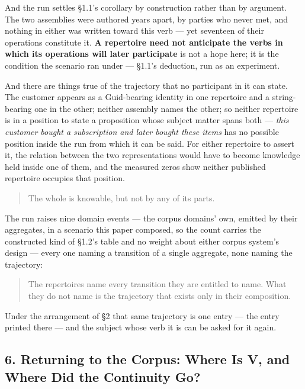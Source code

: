 \documentclass[
]{article}
\newcounter{none} %
\begin{document}
And the run settles §1.1's corollary by construction rather than by
argument. The two assemblies were authored years apart, by parties who
never met, and nothing in either was written toward this verb --- yet
seventeen of their operations constitute it. \textbf{A repertoire need
not anticipate the verbs in which its operations will later participate}
is not a hope here; it is the condition the scenario ran under ---
§1.1's deduction, run as an experiment.

And there are things true of the trajectory that no participant in it
can state. The customer appears as a Guid-bearing identity in one
repertoire and a string-bearing one in the other; neither assembly names
the other; so neither repertoire is in a position to state a proposition
whose subject matter spans both --- \emph{this customer bought a
subscription and later bought these items} has no possible position
inside the run from which it can be said. For either repertoire to
assert it, the relation between the two representations would have to
become knowledge held inside one of them, and the measured zeros show
neither published repertoire occupies that position.

\begin{quote}
The whole is knowable, but not by any of its parts.
\end{quote}

The run raises nine domain events --- the corpus domains' own, emitted
by their aggregates, in a scenario this paper composed, so the count
carries the constructed kind of §1.2's table and no weight about either
corpus system's design --- every one naming a transition of a single
aggregate, none naming the trajectory:

\begin{quote}
The repertoires name every transition they are entitled to name. What
they do not name is the trajectory that exists only in their
composition.
\end{quote}

Under the arrangement of §2 that same trajectory is one entry --- the
entry printed there --- and the subject whose verb it is can be asked
for it again.

\subsection{6. Returning to the Corpus: Where Is V, and Where Did the
Continuity
Go?}\label{returning-to-the-corpus-where-is-v-and-where-did-the-continuity-go}
\end{document}
